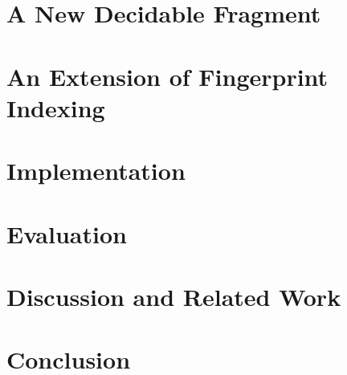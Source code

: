 \section{A New Decidable Fragment}
\label{sec:unif:solid-oracle}

\section{An Extension of Fingerprint Indexing}
\label{sec:unif:indexing}

\section{Implementation}
\label{sec:unif:implementation}

\section{Evaluation}
\label{sec:unif:evaluation}

\section{Discussion and Related Work}

\section{Conclusion}

